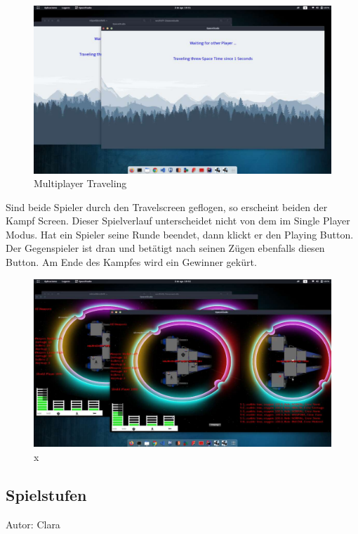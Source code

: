 \documentclass[fontsize=12pt,paper=a4,twoside]{scrartcl}
\begin{document}
\begin{figure}[htp]
	\centering
	\includegraphics[width=1.00\linewidth]{pics/6.PNG}
	\caption{Multiplayer Traveling}
\end{figure}

Sind beide Spieler durch den Travelscreen geflogen, so erscheint beiden der Kampf Screen.
Dieser Spielverlauf unterscheidet nicht von dem im Single Player Modus. Hat ein Spieler seine Runde
beendet, dann klickt er den Playing Button. Der Gegenspieler ist dran und betätigt nach seinen Zügen
ebenfalls diesen Button.
Am Ende des Kampfes wird ein Gewinner gekürt.

\begin{figure}[htp]
	\centering
	\includegraphics[width=1.00\linewidth]{pics/7.PNG}
	\caption{x}
\end{figure}

\subsection{Spielstufen}
Autor: Clara\\
\end{document}
